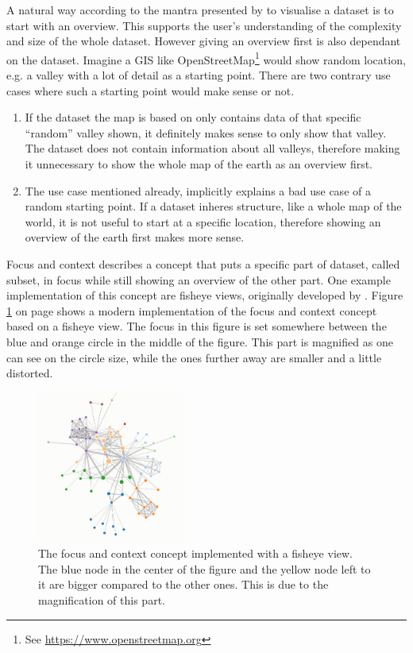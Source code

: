A natural way according to the mantra presented by \citeauthor{Shneiderman1996} to visualise a dataset is to start with an overview. This supports the user's understanding of the complexity and size of the whole dataset. However giving an overview first is also dependant on the dataset. Imagine a \ac{GIS} like OpenStreetMap\footnote{See \href{https://www.openstreetmap.org}{https://www.openstreetmap.org}} would show random location, e.g. a valley with a lot of detail as a starting point. There are two contrary use cases where such a starting point would make sense or not.
\begin{enumerate}
\item If the dataset the map is based on only contains data of that specific ``random'' valley shown, it definitely makes sense to only show that valley. The dataset does not contain information about all valleys, therefore making it unnecessary to show the whole map of the earth as an overview first.
\item The use case mentioned already, implicitly explains a bad use case of a random starting point. If a dataset inheres structure, like a whole map of the world, it is not useful to start at a specific location, therefore showing an overview of the earth first makes more sense.
\end{enumerate}

Focus and context describes a concept that puts a specific part of dataset, called subset, in focus while still showing an overview of the other part. One example implementation of this concept are fisheye views, originally developed by \citeauthor{Furnas:1986} . Figure \ref{fig:focus} on page \pageref{fig:focus} shows a modern implementation of the focus and context concept based on a fisheye view. The focus in this figure is set somewhere between the blue and orange circle in the middle of the figure. This part is magnified as one can see on the circle size, while the ones further away are smaller and a little distorted.

\begin{figure}[!htb]
\centering
\includegraphics[height=5cm,keepaspectratio]{images/methods/interaction/focus.png}
\caption[
    The focus and context concept based implemented with a fisheye view, Urldate: 07.2016 \newline
    \small\texttt{\url{https://bost.ocks.org/mike/fisheye/}}.
]{The focus and context concept implemented with a fisheye view. The blue node in the center of the figure and the yellow node left to it are bigger compared to the other ones. This is due to the magnification of this part.}
\label{fig:focus}
\end{figure}

